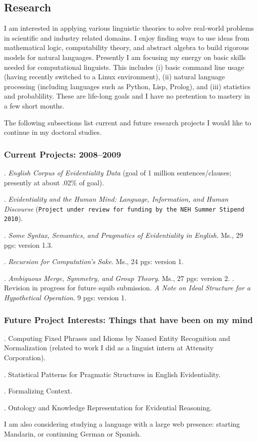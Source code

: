 \documentclass[11pt]{article}
\begin{document}
\subsection{Research}
I am interested in applying various linguistic theories to solve real-world problems in scientific and industry related domains. I enjoy finding ways to use ideas from mathematical logic, computability theory, and abstract algebra to build rigorous models for natural languages. Presently I am focusing my energy on basic skills needed for computational linguists. This includes (i) basic command line usage (having recently switched to a Linux environment), (ii) natural language processing (including languages such as Python, Lisp, Prolog), and (iii) statistics and probablility. These are life-long goals and I have no pretention to mastery in a few short months.   

The following subsections list current and future research projects I would like to continue in my doctoral studies. 

\subsubsection{Current Projects: 2008--2009}
\ex. \textsl{English Corpus of Evidentiality Data} (goal of 1 million sentences/clauses; presently at about .02\% of goal).

\ex. \textsl{Evidentiality and the Human Mind: Language, Information, and Human Discourse} (\texttt{Project under review for funding by the NEH Summer Stipend 2010}). 

\ex. \textsl{Some Syntax, Semantics, and Pragmatics of Evidentiality in English}. Ms., 29 pgs: version 1.3. 

\ex. \textsl{Recursion for Computation's Sake}. Ms., 24 pgs: version 1.

\ex. \textsl{Ambiguous Merge, Symmetry, and Group Theory}. Ms., 27 pgs: version 2. 
\a.  \small{Revision in progress for future squib submission. \textsl{A Note on Ideal Structure for a Hypothetical Operation}. 9 pgs: version 1}.

\subsubsection{Future Project Interests: Things that have been on my mind}
\ex. Computing Fixed Phrases and Idioms by Named Entity Recognition and Normalization (\small{related to work I did as a linguist intern at Attensity Corporation}).

\ex. Statistical Patterns for Pragmatic Structures in English Evidentiality. 

\ex. Formalizing Context.

\ex. Ontology and Knowledge Representation for Evidential Reasoning.

I am also considering studying a language with a large web presence: starting Mandarin, or continuing German or Spanish.  
\end{document}
